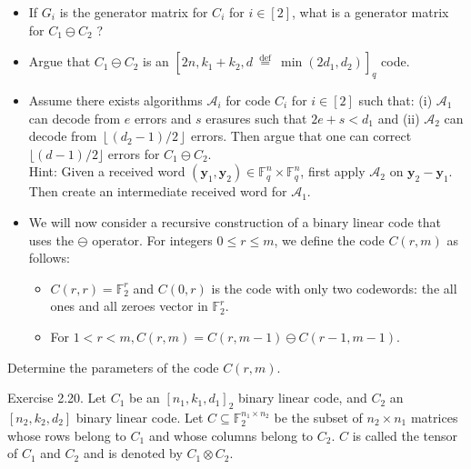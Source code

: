 \documentclass[10pt]{article}
\begin{document}
\begin{itemize}
  \item[1.] If $G_{i}$ is the generator matrix for $C_{i}$ for $i \in[2]$, what is a generator matrix for $C_{1} \ominus C_{2}$ ?
  \item[2.] Argue that $C_{1} \ominus C_{2}$ is an $\left[2 n, k_{1}+k_{2}, d \stackrel{\text { def }}{=} \min \left(2 d_{1}, d_{2}\right)\right]_{q}$ code.
  \item[3.] Assume there exists algorithms $\mathscr{A}_{i}$ for code $C_{i}$ for $i \in[2]$ such that: (i) $\mathscr{A}_{1}$ can decode from $e$ errors and $s$ erasures such that $2 e+s<d_{1}$ and (ii) $\mathscr{A}_{2}$ can decode from $\left\lfloor\left(d_{2}-1\right) / 2\right\rfloor$ errors. Then argue that one can correct $\lfloor(d-1) / 2\rfloor$ errors for $C_{1} \ominus C_{2}$.\\
Hint: Given a received word $\left(\mathbf{y}_{1}, \mathbf{y}_{2}\right) \in \mathbb{F}_{q}^{n} \times \mathbb{F}_{q}^{n}$, first apply $\mathscr{A}_{2}$ on $\mathbf{y}_{2}-\mathbf{y}_{1}$. Then create an intermediate received word for $\mathscr{A}_{1}$.
  \item[4.] We will now consider a recursive construction of a binary linear code that uses the $\ominus$ operator. For integers $0 \leq r \leq m$, we define the code $C(r, m)$ as follows:
  \begin{itemize}
    \item[-] $C(r, r)=\mathbb{F}_{2}^{r}$ and $C(0, r)$ is the code with only two codewords: the all ones and all zeroes vector in $\mathbb{F}_{2}^{r}$.
    \item[-] For $1<r<m, C(r, m)=C(r, m-1) \ominus C(r-1, m-1)$.
  \end{itemize}
\end{itemize}

Determine the parameters of the code $C(r, m)$.

Exercise 2.20. Let $C_{1}$ be an $\left[n_{1}, k_{1}, d_{1}\right]_{2}$ binary linear code, and $C_{2}$ an $\left[n_{2}, k_{2}, d_{2}\right]$ binary linear code. Let $C \subseteq \mathbb{F}_{2}^{n_{1} \times n_{2}}$ be the subset of $n_{2} \times n_{1}$ matrices whose rows belong to $C_{1}$ and whose columns belong to $C_{2}$. $C$ is called the tensor of $C_{1}$ and $C_{2}$ and is denoted by $C_{1} \otimes C_{2}$.
\end{document}
